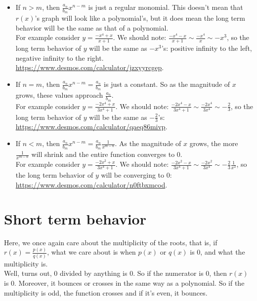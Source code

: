 \documentclass[10pt]{article}
\theoremstyle{definition}
\begin{document}
\begin{itemize}
\item If $n>m$, then $\frac{a_n}{b_m}x^{n-m}$ is just a regular monomial.  This doesn't mean that $r(x)$'s graph will look like a polynomial's, but it does mean the long term behavior will be the same as that of a polynomial.\\

For example consider $y=\frac{-x^4+x}{x+1}$.  We should note: $\frac{-x^4-x}{x+1}\sim\frac{-x^4}{x}
\sim -x^3$, so the long term behavior of $y$ will be the same as $-x^3$'s:  positive infinity to the left, negative infinity to the right.  \url{https://www.desmos.com/calculator/jzxyyrcgep}.

\item If $n=m$, then $\frac{a_n}{b_m}x^{n-m}=\frac{a_n}{b_m}$ is just a constant.  So as the magnitude of $x$ grows, these values approach $\frac{a_n}{b_m}$.\\

For example consider $y=\frac{-2x^4+x}{3x^4+1}$.  We should note: $\frac{-2x^4-x}{3x^4+1}\sim\frac{-2x^4}{3x^4}
\sim -\frac{2}{3}$, so the long term behavior of $y$ will be the same as $-\frac{2}{3}$'s:   \url{https://www.desmos.com/calculator/qaeq86mivp}.
 
\item If $n<m$, then $\frac{a_n}{b_m}x^{n-m}=\frac{a_n}{b_m}\frac{1}{x^{m-n}}$.  As the magnitude of $x$ grows, the more $\frac{1}{x^{m-n}}$ will shrink and the entire function converges to 0.\\

For example consider $y=\frac{-2x^2+x}{3x^4+1}$.  We should note: $\frac{-2x^2-x}{3x^4+1}\sim\frac{-2x^2}{3x^4}
\sim -\frac{2}{3}\frac{1}{x^2}$, so the long term behavior of $y$ will be converging to 0:   \url{https://www.desmos.com/calculator/n0ftbxmcod}.
 
 
\end{itemize}


\section{Short term behavior}

Here, we once again care about the multiplicity of the roots, that is, if $r(x)=\frac{p(x)}{q(x)}$, what we care about is when $p(x)$ or $q(x)$ is 0, and what the multiplicity is.\\

Well, turns out, 0 divided by anything is 0.  So if the numerator is 0, then $r(x)$ is 0.  Moreover, it bounces or crosses in the same way as a polynomial.  So if the multiplicity is odd, the function crosses and if it's even, it bounces.\\
\end{document}
